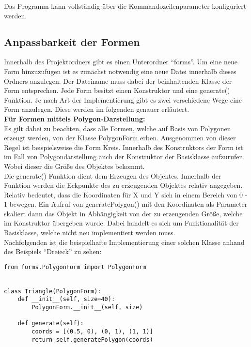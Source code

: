 Das Programm kann vollständig über die Kommandozeilenparameter konfiguriert werden. 

\newpage

\subsection{Anpassbarkeit der Formen}

\vspace{0.5cm}

Innerhalb des Projektordners gibt es einen Unterordner "`forms"'. Um eine neue Form hinzuzufügen ist es zunächst notwendig eine neue Datei innerhalb dieses Ordners anzulegen. Der Dateiname muss dabei der beinhaltenden Klasse der Form entsprechen. Jede Form besitzt einen Konstruktor und eine generate() Funktion. Je nach Art der Implementierung gibt es zwei verschiedene Wege eine Form anzulegen. Diese werden im folgenden genauer erläutert. \\

\textbf{Für Formen mittels Polygon-Darstellung:}\\

Es gilt dabei zu beachten, dass alle Formen, welche auf Basis von Polygonen erzeugt werden, von der Klasse PolygonForm erben. Ausgenommen von dieser Regel ist beispielsweise die Form Kreis. Innerhalb des Konstruktors der Form ist im Fall von Polygondarstellung auch der Konstruktor der Basisklasse aufzurufen. Wobei dieser die Größe des Objektes bekommt.\\

Die generate() Funktion dient dem Erzeugen des Objektes. Innerhalb der Funktion werden die Eckpunkte des zu erzeugenden Objektes relativ angegeben. Relativ bedeutet, dass die Koordinaten für X und Y sich in einem Bereich von 0 - 1 bewegen. Ein Aufruf von generatePolygon() mit den Koordinaten als Parameter skaliert dann das Objekt in Abhängigkeit von der zu erzeugenden Größe, welche im Konstruktor übergeben wurde. Dabei handelt es sich um Funktionalität der Basisklasse, welche nicht neu implementiert werden muss. \\

Nachfolgenden ist die beispielhafte Implementierung einer solchen Klasse anhand des Beispiels "`Dreieck"' zu sehen:\\

\begin{lstlisting}
from forms.PolygonForm import PolygonForm


class Triangle(PolygonForm):
    def __init__(self, size=40):
        PolygonForm.__init__(self, size)

    def generate(self):
        coords = [(0.5, 0), (0, 1), (1, 1)]
        return self.generatePolygon(coords)

\end{lstlisting}

